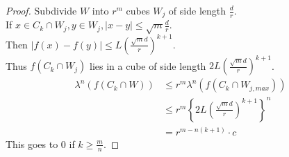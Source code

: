 \documentclass[../main.tex]{subfiles}
\begin{document}
\begin{proof}
Subdivide $W$ into $r^{m}$ cubes $W_j$ of side length $\frac{d}{r}$.\\
If $x\in C_k \cap W_j, y \in W_j, |x-y| \leq \sqrt{m}  \frac{d}{r}$.\\
Then $ | f( x) - f( y) | \leq  L (  \frac{ \sqrt{m} d}{r})^{k+1}$.\\
Thus $f( C_k \cap W_j) $ lies in a cube of side length $2 L ( \frac{\sqrt{m} d}{r})^{k+1}$.
\begin{align*}
	\lambda^{n}( f( C_k \cap W) ) &\leq  r^{m} \lambda^{n}( f( C_k \cap W_{j,max} ) ) \\
				      & \leq r^{m} \left\{ 2 L (  \frac{\sqrt{m} d}{r})^{k+1} \right\}^{n}\\
				      &= r^{m- n ( k+1) }\cdot c
\end{align*}
This goes to 0 if $k \geq \frac{m}{n}$.
\end{proof}
\end{document}
